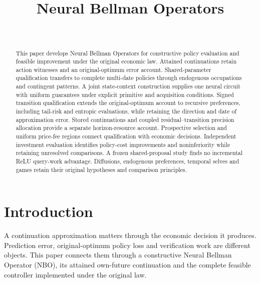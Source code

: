 \documentclass[ecta,nameyear,draft]{econsocart}
\begin{document}
\begin{frontmatter}
\title{Neural Bellman Operators}
\begin{aug}
\author[id=au1,addressref={add1}]{~}
\address[id=add1]{Peking University}
\end{aug}
\begin{abstract}
This paper develops Neural Bellman Operators for constructive policy evaluation and feasible improvement under the original economic law. Attained continuations retain action witnesses and an original-optimum error account. Shared-parameter qualification transfers to complete multi-date policies through endogenous occupations and contingent patterns. A joint state-context construction supplies one neural circuit with uniform guarantees under explicit primitive and acquisition conditions. Signed transition qualification extends the original-optimum account to recursive preferences, including tail-risk and entropic evaluations, while retaining the direction and date of approximation error. Stored continuations and coupled residual--transition precision allocation provide a separate horizon-resource account. Prospective selection and uniform price-fee regions connect qualification with economic decisions. Independent investment evaluation identifies policy-cost improvements and noninferiority while retaining unresolved comparisons. A frozen shared-proposal study finds no incremental ReLU query-work advantage. Diffusions, endogenous preferences, temporal selves and games retain their original hypotheses and comparison principles.
\end{abstract}
\begin{keyword}
\end{keyword}
\end{frontmatter}
\section{Introduction}\label{sec:introduction65}
A continuation approximation matters through the economic decision it produces. Prediction error, original-optimum policy loss and verification work are different objects. This paper connects them through a constructive Neural Bellman Operator (NBO), its attained own-future continuation and the complete feasible controller implemented under the original law.
\end{document}
